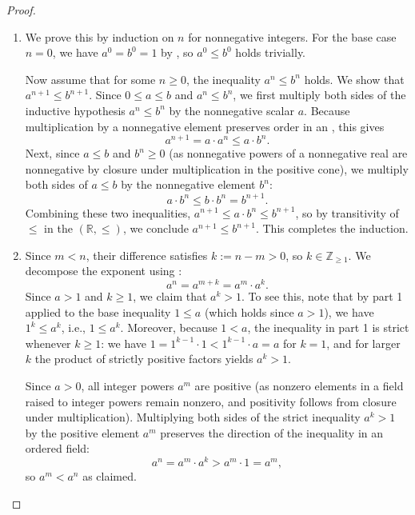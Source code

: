 \begin{proof}
\begin{enumerate}
    \item We prove this by induction on $n$ for nonnegative integers. For the base case $n = 0$, we have $a^0 = b^0 = 1$ by , so $a^0 \leq b^0$ holds trivially.

    Now assume that for some $n \geq 0$, the inequality $a^n \leq b^n$ holds. We show that $a^{n+1} \leq b^{n+1}$. Since $0 \leq a \leq b$ and $a^n \leq b^n$, we first multiply both sides of the inductive hypothesis $a^n \leq b^n$ by the nonnegative scalar $a$. 
    Because multiplication by a nonnegative element preserves order in an , this gives
    $$a^{n+1} = a \cdot a^n \leq a \cdot b^n.$$
    Next, since $a \leq b$ and $b^n \geq 0$ (as nonnegative powers of a nonnegative real are nonnegative by closure under multiplication in the positive cone), we multiply both sides of $a \leq b$ by the nonnegative element $b^n$:
    $$a \cdot b^n \leq b \cdot b^n = b^{n+1}.$$
    Combining these two inequalities, $a^{n+1} \leq a \cdot b^n \leq b^{n+1}$, so by transitivity of $\leq$ in the  $(\mathbb{R}, \leq)$, we conclude $a^{n+1} \leq b^{n+1}$. This completes the induction.

    \item Since $m < n$, their difference satisfies $k := n - m > 0$, so $k \in \mathbb{Z}_{\geq 1}$. We decompose the exponent using :
    $$a^n = a^{m+k} = a^m \cdot a^k.$$
    Since $a > 1$ and $k \geq 1$, we claim that $a^k > 1$. To see this, note that by part 1 applied to the base inequality $1 \leq a$ (which holds since $a > 1$), we have $1^k \leq a^k$, i.e., $1 \leq a^k$. Moreover, because $1 < a$, the inequality in part 1 is strict whenever $k \geq 1$: we have $1 = 1^{k-1} \cdot 1 < 1^{k-1} \cdot a = a$ for $k=1$, and for larger $k$ the product of strictly positive factors yields $a^k > 1$.

    Since $a > 0$, all integer powers $a^m$ are positive (as nonzero elements in a field raised to integer powers remain nonzero, and positivity follows from closure under multiplication). Multiplying both sides of the strict inequality $a^k > 1$ by the positive element $a^m$ preserves the direction of the inequality in an ordered field:
    $$a^n = a^m \cdot a^k > a^m \cdot 1 = a^m,$$
    so $a^m < a^n$ as claimed.


\end{enumerate}
\end{proof}
